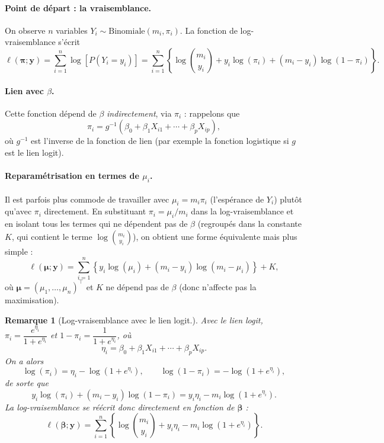 \documentclass[11pt,letterpaper]{article}
\newtheorem{remarque}{Remarque}[section]
\begin{document}
\paragraph{Point de départ : la vraisemblance.}
On observe $n$ variables $Y_i \sim \text{Binomiale}(m_i, \pi_i)$. La fonction de log-vraisemblance s'écrit
\[
\ell(\boldsymbol{\pi}; \boldsymbol{y}) = \sum_{i=1}^n \log\left[P(Y_i = y_i)\right]
= \sum_{i=1}^n \left\{ \log\binom{m_i}{y_i} + y_i \log(\pi_i) + (m_i - y_i)\log(1-\pi_i) \right\}.
\]

\paragraph{Lien avec $\beta$.}
Cette fonction dépend de $\beta$ \emph{indirectement}, via $\pi_i$ : rappelons que
\[
\pi_i = g^{-1}(\beta_0 + \beta_1 X_{i1} + \cdots + \beta_p X_{ip}),
\]
où $g^{-1}$ est l'inverse de la fonction de lien (par exemple la fonction logistique si $g$ est le lien logit).

\paragraph{Reparamétrisation en termes de $\mu_i$.}
Il est parfois plus commode de travailler avec $\mu_i = m_i \pi_i$ (l'espérance de $Y_i$) plutôt qu'avec $\pi_i$ directement. En substituant $\pi_i = \mu_i/m_i$ dans la log-vraisemblance et en isolant tous les termes qui ne dépendent pas de $\beta$ (regroupés dans la constante $K$, qui contient le terme $\log\binom{m_i}{y_i}$), on obtient une forme équivalente mais plus simple :
\[
\ell(\boldsymbol{\mu}; \boldsymbol{y}) = \sum_{i=1}^n \left\{ y_i \log(\mu_i) + (m_i - y_i)\log(m_i - \mu_i) \right\} + K,
\]
où $\boldsymbol{\mu} = (\mu_1, \dots, \mu_n)^\top$ et $K$ ne dépend pas de $\beta$ (donc n'affecte pas la maximisation).

\begin{remarque}[Log-vraisemblance avec le lien logit.]
Avec le lien logit, $\pi_i = \dfrac{e^{\eta_i}}{1+e^{\eta_i}}$ et $1-\pi_i = \dfrac{1}{1+e^{\eta_i}}$, où
\[
\eta_i = \beta_0 + \beta_1 X_{i1} + \cdots + \beta_p X_{ip}.
\]
On a alors
\[
\log(\pi_i) = \eta_i - \log(1+e^{\eta_i}), \qquad \log(1-\pi_i) = -\log(1+e^{\eta_i}),
\]
de sorte que
\[
y_i \log(\pi_i) + (m_i - y_i)\log(1-\pi_i) = y_i \eta_i - m_i \log(1+e^{\eta_i}).
\]
La log-vraisemblance se réécrit donc directement en fonction de $\boldsymbol{\beta}$ :
\[
\ell(\boldsymbol{\beta}; \boldsymbol{y}) = \sum_{i=1}^n \left\{ \log\binom{m_i}{y_i} + y_i \eta_i - m_i \log\left(1+e^{\eta_i}\right) \right\}.
\]
\end{remarque}
\end{document}
